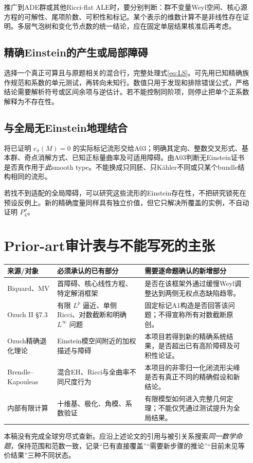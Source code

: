 \documentclass[UTF8,a4paper,11pt,fontset=fandol]{ctexart}
\numberwithin{equation}{section}
\theoremstyle{definition}
\begin{document}
推广到ADE群或其他Ricci-flat ALE时，要分别判断：群不变量Weyl空间、核心源方程的可解性、尾项阶数、可积性和标记。某个表示的维数计算不是非线性存在证明。多层气泡树和变化节点数的统一结论，应在固定单层结果核准后再考虑。

\subsection{精确Einstein的产生或局部障碍}
选择一个真正可算且与原题相关的混合行，完整处理式\eqref{eq:LS}。可先用已知精确族作规范和系数的单元测试，再转向未知行。数值只用于发现和排除错误公式，严格结论需要解析符号或区间余项与逆估计。若不能控制同阶项，则停止把单个正系数解释为不存在性。

\subsection{与全局无Einstein地理结合}
将已证明 $e_\sigma(M)=0$ 的实际标记流形交给A03；明确其定向、整数交叉形式、基本群、奇点消解方式、已知正标量曲率及可适用障碍。由A03判断无Einstein证书是否真作用于\emph{此}smooth type。不能换成只同胚、只K\"ahler不同或只某个bundle结构相同的流形。

若找不到适配的全局障碍，可以研究这些流形的Einstein存在性，不把研究锁死在预设反例上。新的精确度量同样具有独立价值，但它只解决所覆盖的实例，不自动证明 $P_4^\sigma$。

\section{Prior-art审计表与不能写死的主张}
\begin{longtable}{L{.22\textwidth}L{.34\textwidth}L{.35\textwidth}}
\toprule 来源/对象 & 必须承认的已有部分 & 需要逐命题确认的新增部分\\\midrule\endhead
Biquard、MV & 首障碍、核心线性方程、特定解消框架 & 是否在该框架外通过缓慢Weyl调整达到两侧无权点态缺陷趋零。\\
Ozuch II \S7.3 & 有限 $L^p$ 逼近、单侧Ricci、对数截断和明确 $L^\infty$ 问题 & 固定标记A1构造是否回答该问题；不得宣称所有对数截断原创。\\
Ozuch精确退化理论 & Einstein模空间附近的加权描述与障碍 & 本项目若得到新的精确系统结果，是否超出已有高阶障碍及可积性论证。\\
Brendle--Kapouleas & 混合EH、Ricci与全曲率不同尺度行为 & 本项目的非零归一化闭流形尖峰是否有真正不同的精确假设和新结论。\\
内部有限计算 & 十维基、极化、角模、系数验证 & 有限模型如何进入完整几何定理；不能仅凭通过测试提升为全局结果。\\\bottomrule
\end{longtable}
本稿没有完成全球穷尽式查新。应沿上述论文的引用与被引关系搜索\emph{同一数学命题}，保持范围和范数一致，记录“已有直接覆盖”“需要新步骤的推论”“目前未见等价结果”三种不同状态。
\end{document}

